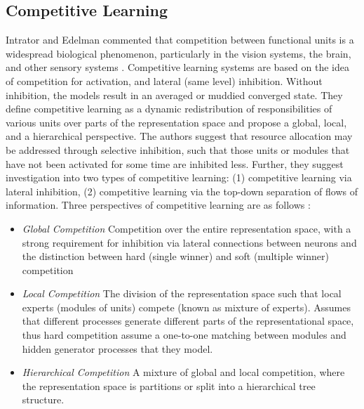 %
%
\subsection{Competitive Learning}
\label{subsec:cs:related:competitive}
Intrator and Edelman commented that competition between functional units is a widespread biological phenomenon, particularly in the vision systems, the brain, and other sensory systems \cite{Intrator1997}. Competitive learning systems are based on the idea of competition for activation, and lateral (same level) inhibition. Without inhibition, the models result in an averaged or muddied converged state. They define competitive learning as a dynamic redistribution of responsibilities of various units over parts of the representation space and propose a global, local, and a hierarchical perspective. The authors suggest that resource allocation may be addressed through selective inhibition, such that those units or modules that have not been activated for some time are inhibited less. Further, they suggest investigation into two types of competitive learning: (1) competitive learning via lateral inhibition, (2) competitive learning via the top-down separation of flows of information. Three perspectives of competitive learning are as follows \cite{Intrator1997}:

\begin{itemize}
	\item \emph{Global Competition} Competition over the entire representation space, with a strong requirement for inhibition via lateral connections between neurons and the distinction between hard (single winner) and soft (multiple winner) competition
	\item \emph{Local Competition} The division of the representation space such that local experts (modules of units) compete (known as mixture of experts). Assumes that different processes generate different parts of the representational space, thus hard competition assume a one-to-one matching between modules and hidden generator processes that they model.
	\item \emph{Hierarchical Competition} A mixture of global and local competition, where the representation space is partitions or split into a hierarchical tree structure.
\end{itemize} 

